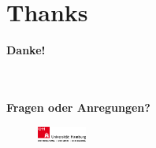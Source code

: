 
\section*{Thanks}

\begin{frame}
    
    \centering
    \vspace{2pt}
    
    \textbf{\Huge Danke!}
 
    \ \\
    \ \\
    \textbf{Fragen oder Anregungen?}
    
    
    \vspace{1.5pt}
    \begin{figure}
      \centering\includegraphics[height=15pt]{assets/logo/uhh.pdf}
    \end{figure}
\end{frame}